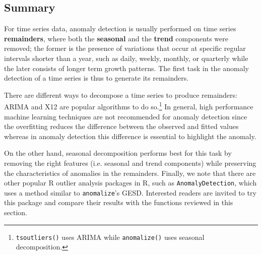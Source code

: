 \subsection{Summary}
For time series data, anomaly detection is usually performed on time series \textbf{remainders}, where both the  \textbf{seasonal} and the \textbf{trend} components were removed; the former is the presence of variations that occur at specific regular intervals shorter than a year, such as daily, weekly, monthly, or quarterly while the later consists of longer term growth patterns. \newl The first task in the anomaly detection of a time series is thus to generate its remainders. 
\par There are different ways to decompose a time series to produce remainders: ARIMA and X12 are popular algorithms to do so.\footnote{\texttt{tsoutliers()} uses ARIMA while \texttt{anomalize()} uses seasonal decomposition.} \newl In general, high performance machine learning techniques are not recommended for anomaly detection since the overfitting reduces the difference between the observed and fitted values whereas in anomaly detection this difference is essential to highlight the anomaly. \par On the other hand, seasonal decomposition performs best for this task by removing the right features (i.e. seasonal and trend components) while preserving the characteristics of anomalies in the remainders. \newl Finally, we note that there are other popular R outlier analysis packages in R, such as \verb|AnomalyDetection|, which uses a method similar to \verb|anomalize|'s GESD. Interested readers are invited to try this package and compare their results with the functions reviewed in this section. 

